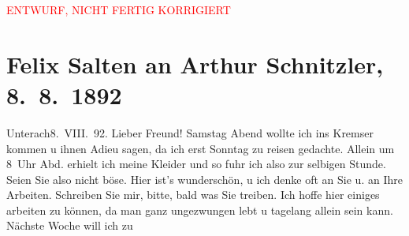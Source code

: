 
\begin{center}
            \textcolor{red}{ENTWURF, NICHT FERTIG KORRIGIERT}
                      \end{center}
            
         
         \renewcommand{\erwaehntePersonen}{Personen: Hermann Bahr, Richard Beer-Hofmann, Marie Glümer, Hugo von Hofmannsthal, Paul Horn, Felix Salten, Gustav Schwarzkopf}
         \renewcommand{\erwaehnteOrte}{Orte: Bad Ischl, Berghof, Café Kremser, Deutschland, Unterach am Attersee, Wien}
         \renewcommand{\erwaehnteWerke}{}
               \section[Felix Salten an Arthur Schnitzler, 8. 8. 1892]{ Felix Salten an Arthur Schnitzler, 8. 8. 1892}\nopagebreak{}\rehead{ }\begin{ledgroupsized}[t]{13cm}\normalsize\beginnumbering{} \toendnotes[C]{\smallbreak\pagebreak[2]} 
\toendnotes[C]{\smallbreak}\pstart
           \raggedleft{}{\pb}Unterach8. VIII. 92.\pend
           \pstart
           Lieber Freund!{ }Samstag{ }Abend wollte ich ins Kremser kommen u
               ihnen Adieu sagen, da ich erst Sonntag zu reisen
               gedachte. Allein um 8 Uhr Abd. erhielt ich meine Kleider und so fuhr ich
               also zur selbigen Stunde. Seien Sie also nicht böse. Hier ist’s wunderschön, u ich
               denke oft an Sie u. an Ihre Arbeiten. Schreiben Sie mir, bitte, bald was Sie
               treiben.\pend
           \pstart
           {\pb}Ich hoffe hier einiges arbeiten zu können,
               da man ganz ungezwungen lebt u tagelang allein sein kann. Nächste Woche will ich zu

\end{ledgroupsized}
